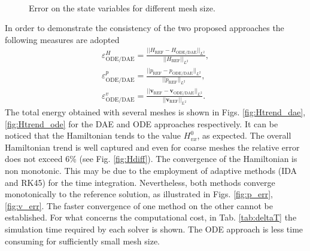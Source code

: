 \begin{figure}[ht]%
	\centering
	\hspace{8pt}%
	 \\
	\caption[]{Error on the state variables for different mesh size.}%
	\label{fig:error_x}%
\end{figure}

In order to demonstrate the consistency of the two proposed approaches the following measures are adopted
\begin{align*}
\varepsilon^{H}_{\text{ODE}/\text{DAE}} = \frac{||H_{\text{REF}} - H_{\text{ODE}/\text{DAE}} ||_{L^2}}{||H_{\text{REF}}||_{L^2}}, \\
\varepsilon^p_{\text{ODE}/\text{DAE}} = \frac{||p_{\text{REF}} - p_{\text{ODE}/\text{DAE}} ||_{L^2}}{||p_{\text{REF}}||_{L^2}}, \\
\varepsilon^v_{\text{ODE}/\text{DAE}} = \frac{||\bm{v}_{\text{REF}} - \bm{v}_{\text{ODE}/\text{DAE}} ||_{L^2}}{||\bm{v}_{\text{REF}}||_{L^2}}. 
\end{align*}
The total energy obtained with several meshes is shown in Figs. \ref{fig:Htrend_dae}, \ref{fig:Htrend_ode} for the DAE and ODE approaches respectively. It can be noticed that the Hamiltonian tends to the value $H_{vx}^0$, as expected. The overall Hamiltonian trend is well captured and even for coarse meshes the relative error does not exceed 6\% (see Fig. \ref{fig:Hdiff}). The convergence of the Hamiltonian is non monotonic. This may be due to the employment of adaptive methods (IDA and RK45) for the time integration. Nevertheless, both methods converge monotonically to the reference solution, as illustrated in Figs. \ref{fig:p_err}, \ref{fig:v_err}. The faster convergence of one method on the other cannot be established. For what concerns the computational cost, in Tab. \ref{tab:deltaT} the simulation time required by each solver is shown. The ODE approach is less time consuming for sufficiently small mesh size.

